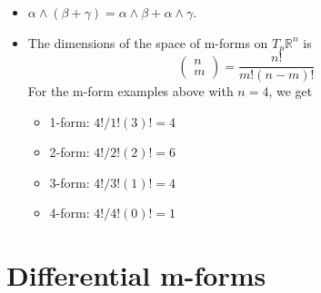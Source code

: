 \documentclass[11pt]{article}
\begin{document}
\begin{itemize}
    \item $\alpha \wedge (\beta + \gamma) = \alpha \wedge \beta + \alpha \wedge \gamma$.
    
    \item The dimensions of the space of m-forms on $T_p \mathbb{R}^n$ is 
    \begin{equation}
        \begin{pmatrix} n \\ m \end{pmatrix} = \frac{n!}{m!(n-m)!}
    \end{equation}
    For the m-form examples above with $n=4$, we get
    \begin{itemize}
        \item 1-form: $4! / 1!(3)! = 4$
        \item 2-form: $4! / 2!(2)! = 6$
        \item 3-form: $4! / 3!(1)! = 4$
        \item 4-form: $4! / 4!(0)! = 1$
    \end{itemize}

\end{itemize}

\section{Differential m-forms}
\end{document}
